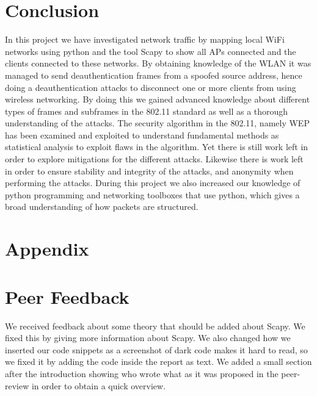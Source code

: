 \section{Conclusion}
In this project we have investigated network traffic by mapping local WiFi networks using python and the tool Scapy to show all APs connected and the clients connected to these networks. By obtaining knowledge of the WLAN it was managed to send deauthentication frames from a spoofed source address, hence doing a deauthentication attacks to disconnect one or more clients from using wireless networking. By doing this we gained advanced knowledge about different types of frames and subframes in the 802.11 standard as well as a thorough understanding of the attacks. The security algorithm in the 802.11, namely WEP has been examined and exploited to understand fundamental methods as statistical analysis to exploit flaws in the algorithm. Yet there is still work left in order to explore mitigations for the different attacks. Likewise there is work left in order to ensure stability and integrity of the attacks, and anonymity when performing the attacks.  
During this project we also increased our knowledge of python programming and networking toolboxes that use python, which gives a broad understanding of how packets are structured. 


\section{Appendix}

\section{Peer Feedback}
We received feedback about some theory that should be added about Scapy. We fixed this by giving more information about Scapy.
We also changed how we inserted our code snippets as a screenshot of dark code makes it hard to read, so we fixed it by adding the code inside the report as text. 
We added a small section after the introduction showing who wrote what as it was proposed in the peer-review in order to obtain a quick overview.


